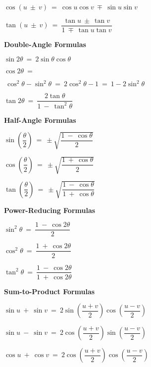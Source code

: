 \documentclass{article}
\begin{document}
\begin{large}
\begin{multicols}{2}
{$\cos(u\ \pm\ v)\ =\ \cos u \cos v\ \mp\ \sin u \sin v$

$\tan(u\ \pm\ v)\ =\ \dfrac{\tan u\ \pm\ \tan v}{1\ \mp\ \tan u \tan v}$

\textbf{Double-Angle Formulas}

$\sin 2\theta\ =\ 2 \sin\theta \cos\theta$

$\cos 2\theta\ =$\begin{small} $\ \cos^{2}\theta - \sin^{2}\theta\ =\ 2\cos^{2}\theta - 1\ =\ 1 - 2\sin^{2}\theta$ \end{small}

$\tan 2\theta\ =\ \dfrac{2\tan\theta}{1\ -\ \tan^{2}\theta}$

\vspace{0.1in}

\begin{multicols}{2}

\begin{small}

\textbf{Half-Angle Formulas}

$\sin\left(\dfrac{\theta}{2}\right)\ =\ \pm\sqrt{\dfrac{1\ -\ \cos\theta}{2}}$

$\cos\left(\dfrac{\theta}{2}\right)\ =\ \pm\sqrt{\dfrac{1\ +\ \cos\theta}{2}}$

$\tan\left(\dfrac{\theta}{2}\right)\ =\ \pm\sqrt{\dfrac{1\ -\ \cos\theta}{1\ +\ \cos\theta}}$

\begin{raggedright}

\textbf{Power-Reducing Formulas}

$\sin^{2}\theta\ =\ \dfrac{1\ -\ \cos 2\theta}{2}$

$\cos^{2}\theta\ =\ \dfrac{1\ +\ \cos 2\theta}{2}$

$\tan^{2}\theta\ =\ \dfrac{1\ -\ \cos 2\theta}{1\ +\ \cos 2\theta}$

\end{raggedright}

\end{small}

\end{multicols}

\textbf{Sum-to-Product Formulas}

$\sin u\ +\ \sin v\ =\ 2\sin\left(\dfrac{u+v}{2}\right)\cos\left(\dfrac{u-v}{2}\right)$

$\sin u\ -\ \sin v\ =\ 2\cos\left(\dfrac{u+v}{2}\right)\sin\left(\dfrac{u-v}{2}\right)$

$\cos u\ +\ \cos v\ =\ 2\cos\left(\dfrac{u+v}{2}\right)\cos\left(\dfrac{u-v}{2}\right)$

}
\end{multicols}
\end{large}
\end{document}
